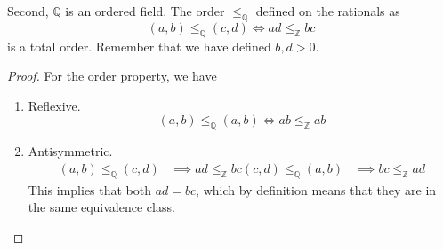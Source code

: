   \begin{theorem}
    Second, $\mathbb{Q}$ is an ordered field. The order $\leq_{\mathbb{Q}}$ defined on the rationals as 
    \begin{equation}
      (a, b) \leq_{\mathbb{Q}} (c, d) \iff ad \leq_{\mathbb{Z}} bc
    \end{equation}
    is a total order. Remember that we have defined $b, d > 0$.  
  \end{theorem}
  \begin{proof}
    For the order property, we have 
    \begin{enumerate}
      \item Reflexive. 
      \begin{equation}
        (a, b) \leq_{\mathbb{Q}} (a, b) \iff ab \leq_{\mathbb{Z}} ab
      \end{equation} 

      \item Antisymmetric. 
      \begin{align}
        (a, b) \leq_{\mathbb{Q}} (c, d) & \implies ad \leq_{\mathbb{Z}} bc
        (c, d) \leq_{\mathbb{Q}} (a, b) & \implies bc \leq_{\mathbb{Z}} ad
      \end{align} 
      This implies that both $ad = bc$, which by definition means that they are in the same equivalence class. 


\end{enumerate}
\end{proof}

